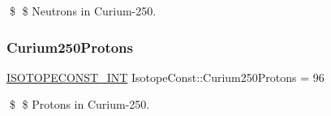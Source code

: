 \$ \$ Neutrons in Curium-\/250. \mbox{\label{group___isotope_const-_curium-_cm250_gaa10cbb48c2ba8fabc271a3619db5f1a1}} 
\subsubsection{\texorpdfstring{Curium250\+Protons}{Curium250Protons}}
{\footnotesize\ttfamily \mbox{\hyperlink{group___isotope_const-_macros_ga5f18360b3e99483a35c32d789e62621c}{I\+S\+O\+T\+O\+P\+E\+C\+O\+N\+S\+T\+\_\+\+I\+NT}} Isotope\+Const\+::\+Curium250\+Protons = 96}

\$ \$ Protons in Curium-\/250. 